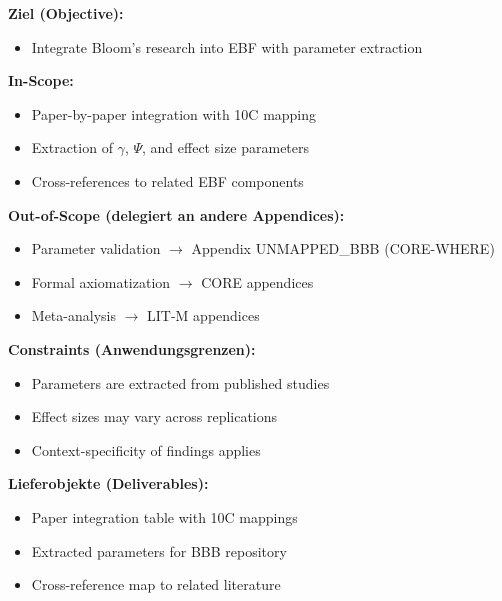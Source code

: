 
\begin{tcolorbox}[
    colback=orange!5!white,
    colframe=orange!75!black,
    title={\textbf{Appendix Scope: Ziel / In-Scope / Out-of-Scope / Constraints}},
    fonttitle=\bfseries
]

\textbf{Ziel (Objective):}
\begin{itemize}[nosep]
    \item Integrate Bloom's research into EBF with parameter extraction
\end{itemize}

\textbf{In-Scope:}
\begin{itemize}[nosep]
    \item Paper-by-paper integration with 10C mapping
    \item Extraction of $\gamma$, $\Psi$, and effect size parameters
    \item Cross-references to related EBF components
\end{itemize}

\textbf{Out-of-Scope (delegiert an andere Appendices):}
\begin{itemize}[nosep]
    \item Parameter validation $\rightarrow$ Appendix UNMAPPED_BBB (CORE-WHERE)
    \item Formal axiomatization $\rightarrow$ CORE appendices
    \item Meta-analysis $\rightarrow$ LIT-M appendices
\end{itemize}

\textbf{Constraints (Anwendungsgrenzen):}
\begin{itemize}[nosep]
    \item Parameters are extracted from published studies
    \item Effect sizes may vary across replications
    \item Context-specificity of findings applies
\end{itemize}

\textbf{Lieferobjekte (Deliverables):}
\begin{itemize}[nosep]
    \item Paper integration table with 10C mappings
    \item Extracted parameters for BBB repository
    \item Cross-reference map to related literature
\end{itemize}

\end{tcolorbox}


